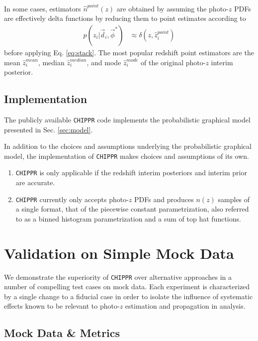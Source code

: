 \documentclass[iop]{emulateapj}
\newcommand{\chippr}{\texttt{CHIPPR} }
\begin{document}
In some cases, estimators $\hat{n}^{point}(z)$ are obtained by assuming the 
photo-$z$ PDFs are effectively delta functions by reducing them to point 
estimates according to
\begin{align}
\label{eq:delta}
p(z_{i} | \vec{d}_{i}, \vec{\phi}^{*}) &\approx \delta(z, \hat{z}_{i}^{point})
\end{align}
before applying Eq. \ref{eq:stack}.  The most popular redshift point estimators 
are the mean $\hat{z}^{mean}_{i}$, median $\hat{z}^{median}_{i}$, and mode 
$\hat{z}^{mode}_{i}$ of the original photo-$z$ interim posterior.

\subsection{Implementation}
\label{sec:implementation}

The publicly available \chippr code implements the probabilistic graphical 
model presented in Sec. \ref{sec:model}.  

In addition to the choices and assumptions underlying the probabilistic 
graphical model, the implementation of \chippr makes choices and assumptions of 
its own.

\begin{enumerate}
	\item \chippr is only applicable if the redshift interim posteriors and 
interim prior are accurate.
	\item \chippr currently only accepts photo-$z$ PDFs and produces $n(z)$ 
samples of a single format, that of the piecewise constant parametrization, 
also referred to as a binned histogram parametrization and a sum of top hat 
functions.
\end{enumerate}

\section{Validation on Simple Mock Data}
\label{sec:validation}

We demonstrate the superiority of \chippr over alternative approaches in a 
number of compelling test cases on mock data.  Each experiment is characterized 
by a single change to a fiducial case in order to isolate the influence of 
systematic effects known to be relevant to photo-$z$ estimation and propagation 
in analysis.  

\subsection{Mock Data \& Metrics}
\label{sec:validintro}
\end{document}
